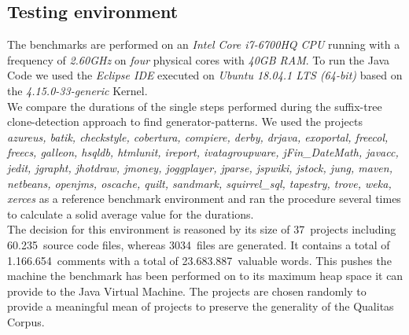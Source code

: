 \subsection{Testing environment}
The benchmarks are performed on an \textit{Intel Core i7-6700HQ CPU} running with a frequency of \textit{2.60GHz} on \textit{four} physical cores with \textit{40GB RAM}. To run the Java Code we used the \textit{Eclipse IDE}  executed on \textit{Ubuntu 18.04.1 LTS (64-bit)} based on the \textit{4.15.0-33-generic} Kernel.\\
We compare the durations of the single steps performed during the suffix-tree clone-detection approach to find generator-patterns. We used the projects \textit{azureus, batik, checkstyle, cobertura, compiere, derby, drjava, exoportal, freecol, freecs, galleon, hsqldb, htmlunit, ireport, ivatagroupware, jFin\_DateMath, javacc, jedit, jgrapht, jhotdraw, jmoney, joggplayer, jparse, jspwiki, jstock, jung, maven, netbeans, openjms, oscache, quilt, sandmark, squirrel\_sql, tapestry, trove, weka, xerces} as a reference benchmark environment and ran the procedure several times to calculate a solid average value for the durations. \\
The decision for this environment is reasoned by its size of 37~projects including 60.235~source code files, whereas 3034~files are generated. It contains a total of 1.166.654~comments with a total of 23.683.887~valuable words. This pushes the machine the benchmark has been performed on to its maximum heap space it can provide to the Java Virtual Machine. The projects are chosen randomly to provide a meaningful mean of projects to preserve the generality of the Qualitas Corpus.

